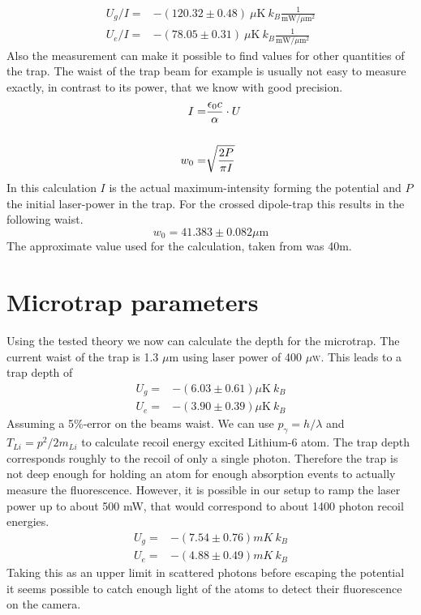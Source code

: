 \begin{align}
U_g/I=&-(120.32\pm 0.48)\ \mu\mathrm{K}\ k_B\frac{1}{\mathrm{mW}/\mu \mathrm{m}^2}\\
U_e/I=&-(78.05\pm 0.31)\ \mu\mathrm{K}\ k_B\frac{1}{\mathrm{mW}/\mu \mathrm{m}^2}
\end{align}
Also the measurement can make it possible to find values for other quantities of the trap. The waist of the trap beam for example is usually not easy to measure exactly, in contrast to its power, that we know with good precision.
\begin{align}
I=&\frac{\epsilon_0 c}{\alpha}\cdot U\\\notag\\
w_0=&\sqrt{\frac{2P}{\pi I}}
\end{align}
In this calculation $I$ is the actual maximum-intensity forming the potential and $P$ the initial laser-power in the trap. For the crossed dipole-trap this results in the following waist.
\begin{equation}
w_0=41.383\pm 0.082 \mu \mathrm{m}
\end{equation}
The approximate value used for the calculation, taken from \cite{lompe} was 40\mu m.

\section{Microtrap parameters}

Using the tested theory we now can calculate the depth for the microtrap. The current waist of the trap is 1.3 $\mu$m using laser power of 400 $\mu$\textsc{w}. This leads to a trap depth of
\begin{align}
U_g=&-(6.03\pm 0.61)\mu\mathrm{K}\ k_B\\
U_e=&-(3.90\pm 0.39)\mu\mathrm{K}\ k_B
\end{align}
Assuming a 5\%-error on the beams waist. We can use $p_\gamma=h/\lambda$ and $T_{Li}=p^2/2m_{Li}$ to calculate recoil energy excited Lithium-6 atom. The trap depth corresponds roughly to the recoil of only a single photon. Therefore the trap is not deep enough for holding an atom for enough absorption events to actually measure the fluorescence. However, it is possible in our setup to ramp the laser power up to about 500 mW, that would correspond to about 1400 photon recoil energies.
\begin{align}
U_g=&-(7.54\pm 0.76)\unit{mK}\ k_B\\
U_e=&-(4.88\pm 0.49)\unit{mK}\ k_B
\end{align}
Taking this as an upper limit in scattered photons before escaping the potential it seems possible to catch enough light of the atoms to detect their fluorescence on the camera. 

